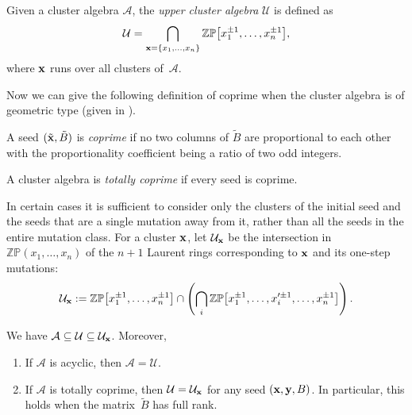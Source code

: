 \begin{Definition}
Given a cluster algebra $\mathcal{A}$, the \emph{upper cluster algebra} $\mathcal{U}$ is def\/ined as
\begin{gather*}
 \mathcal{U} =
 \bigcap_{{\bf x}=\{x_1,\ldots,x_n\}}
  \mathbb{ZP}\big[x_1^{\pm 1},\ldots,x_n^{\pm 1}\big],
\end{gather*}
where ${\bf x}$ runs over all clusters of~$\mathcal{A}$.
\end{Definition}

Now we can give the following def\/inition of coprime when the cluster algebra is of geometric type (given in \cite[Lemma~3.1]{BFZ}).

\begin{Definition}
A seed  $(\tilde{\bf x},\tilde{B})$ is \emph{coprime} if no two columns of $\tilde{B}$ are proportional to each other with the proportionality coef\/f\/icient being a ratio of two odd integers.

A cluster algebra is \emph{totally coprime} if every seed is coprime.
\end{Definition}


In certain cases it is suf\/f\/icient to consider only the clusters of the initial seed and the seeds that are a single mutation away from it, rather than all the seeds in the entire mutation class.
For a cluster ${\bf x}$,  let $\mathcal{U}_{{\bf x}}$ be the intersection in $\mathbb{ZP}(x_1,\ldots,x_n)$ of the $n+1$ Laurent rings corresponding to ${\bf x}$ and its one-step mutations:
\begin{gather*}
\mathcal{U}_{\bf x} := \mathbb{ZP}\big[x_1^{\pm 1},\ldots, x_n^{\pm 1}\big] \cap \left(\bigcap_i \mathbb{ZP}\big[x_1^{\pm 1},\ldots,x_i'^{\pm 1},\ldots, x_n^{\pm 1}\big]\right).
\end{gather*}

\begin{Theorem}\label{UB}
We have
 $\mathcal{A}\subseteq\mathcal{U}\subseteq\mathcal{U}_{\bf x}$. Moreover,
\begin{enumerate}\itemsep=0pt
\item[$(i)$] If $\mathcal{A}$ is acyclic, then $\mathcal{A}=\mathcal{U}$.

\item[$(ii)$] If $\mathcal{A}$ is totally coprime, then $\mathcal{U}=\mathcal{U}_{{\bf x}}$ for any seed $({\bf x},{\bf y},B)$. In particular, this holds when the matrix~$\tilde{B}$ has full rank.
\end{enumerate}
\end{Theorem}


